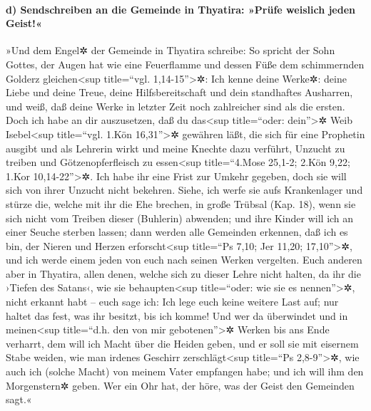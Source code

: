 \hypertarget{d-sendschreiben-an-die-gemeinde-in-thyatira-pruxfcfe-weislich-jeden-geist}{%
\paragraph{d) Sendschreiben an die Gemeinde in Thyatira: »Prüfe weislich
jeden
Geist!«}\label{d-sendschreiben-an-die-gemeinde-in-thyatira-pruxfcfe-weislich-jeden-geist}}

 »Und dem Engel✲ der Gemeinde in Thyatira schreibe: So
spricht der Sohn Gottes, der Augen hat wie eine Feuerflamme und dessen
Füße dem schimmernden Golderz gleichen\textless sup title=``vgl.
1,14-15''\textgreater✲:  Ich kenne deine Werke✲: deine
Liebe und deine Treue, deine Hilfsbereitschaft und dein standhaftes
Ausharren, und weiß, daß deine Werke in letzter Zeit noch zahlreicher
sind als die ersten.  Doch ich habe an dir auszusetzen,
daß du das\textless sup title=``oder: dein''\textgreater✲ Weib
Isebel\textless sup title=``vgl. 1.Kön 16,31''\textgreater✲ gewähren
läßt, die sich für eine Prophetin ausgibt und als Lehrerin wirkt und
meine Knechte dazu verführt, Unzucht zu treiben und Götzenopferfleisch
zu essen\textless sup title=``4.Mose 25,1-2; 2.Kön 9,22; 1.Kor
10,14-22''\textgreater✲.  Ich habe ihr eine Frist zur
Umkehr gegeben, doch sie will sich von ihrer Unzucht nicht bekehren.
 Siehe, ich werfe sie aufs Krankenlager und stürze die,
welche mit ihr die Ehe brechen, in große Trübsal (Kap. 18), wenn sie
sich nicht vom Treiben dieser (Buhlerin) abwenden;  und
ihre Kinder will ich an einer Seuche sterben lassen; dann werden alle
Gemeinden erkennen, daß ich es bin, der Nieren und Herzen
erforscht\textless sup title=``Ps 7,10; Jer 11,20; 17,10''\textgreater✲,
und ich werde einem jeden von euch nach seinen Werken vergelten.
 Euch anderen aber in Thyatira, allen denen, welche sich
zu dieser Lehre nicht halten, da ihr die ›Tiefen des Satans‹, wie sie
behaupten\textless sup title=``oder: wie sie es nennen''\textgreater✲,
nicht erkannt habt -- euch sage ich: Ich lege euch keine weitere Last
auf;  nur haltet das fest, was ihr besitzt, bis ich
komme!  Und wer da überwindet und in meinen\textless sup
title=``d.h. den von mir gebotenen''\textgreater✲ Werken bis ans Ende
verharrt, dem will ich Macht über die Heiden geben,  und
er soll sie mit eisernem Stabe weiden, wie man irdenes Geschirr
zerschlägt\textless sup title=``Ps 2,8-9''\textgreater✲, 
wie auch ich (solche Macht) von meinem Vater empfangen habe; und ich
will ihm den Morgenstern✲ geben.  Wer ein Ohr hat, der
höre, was der Geist den Gemeinden sagt.«

